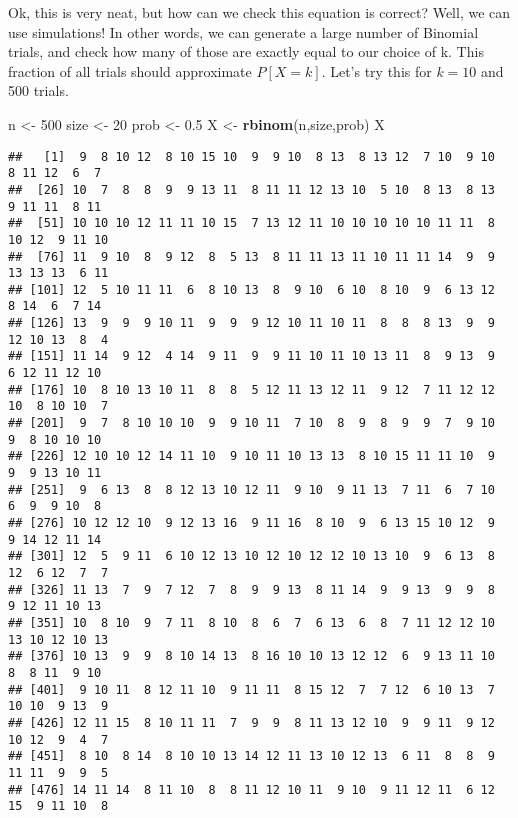 \documentclass[
]{book}
\newenvironment{Shaded}{\begin{snugshade}}{\end{snugshade}}
\newcommand{\DecValTok}[1]{\textcolor[rgb]{0.00,0.00,0.81}{#1}}
\newcommand{\FloatTok}[1]{\textcolor[rgb]{0.00,0.00,0.81}{#1}}
\newcommand{\KeywordTok}[1]{\textcolor[rgb]{0.13,0.29,0.53}{\textbf{#1}}}
\newcommand{\NormalTok}[1]{#1}
\newcommand{\StringTok}[1]{\textcolor[rgb]{0.31,0.60,0.02}{#1}}
\begin{document}
Ok, this is very neat, but how can we check this equation is correct? Well, we can use simulations! In other words, we can generate a large number of Binomial trials, and check how many of those are exactly equal to our choice of k. This fraction of all trials should approximate \(P[X=k]\). Let's try this for \(k=10\) and 500 trials.

\begin{Shaded}
\begin{Highlighting}[]
\NormalTok{n \textless{}{-}}\StringTok{ }\DecValTok{500}
\NormalTok{size \textless{}{-}}\StringTok{ }\DecValTok{20}
\NormalTok{prob \textless{}{-}}\StringTok{ }\FloatTok{0.5}
\NormalTok{X \textless{}{-}}\StringTok{ }\KeywordTok{rbinom}\NormalTok{(n,size,prob)}
\NormalTok{X}
\end{Highlighting}
\end{Shaded}

\begin{verbatim}
##   [1]  9  8 10 12  8 10 15 10  9  9 10  8 13  8 13 12  7 10  9 10  8 11 12  6  7
##  [26] 10  7  8  8  9  9 13 11  8 11 11 12 13 10  5 10  8 13  8 13  9 11 11  8 11
##  [51] 10 10 10 12 11 11 10 15  7 13 12 11 10 10 10 10 10 11 11  8 10 12  9 11 10
##  [76] 11  9 10  8  9 12  8  5 13  8 11 11 13 11 10 11 11 14  9  9 13 13 13  6 11
## [101] 12  5 10 11 11  6  8 10 13  8  9 10  6 10  8 10  9  6 13 12  8 14  6  7 14
## [126] 13  9  9  9 10 11  9  9  9 12 10 11 10 11  8  8  8 13  9  9 12 10 13  8  4
## [151] 11 14  9 12  4 14  9 11  9  9 11 10 11 10 13 11  8  9 13  9  6 12 11 12 10
## [176] 10  8 10 13 10 11  8  8  5 12 11 13 12 11  9 12  7 11 12 12 10  8 10 10  7
## [201]  9  7  8 10 10 10  9  9 10 11  7 10  8  9  8  9  9  7  9 10  9  8 10 10 10
## [226] 12 10 10 12 14 11 10  9 10 11 10 13 13  8 10 15 11 11 10  9  9  9 13 10 11
## [251]  9  6 13  8  8 12 13 10 12 11  9 10  9 11 13  7 11  6  7 10  6  9  9 10  8
## [276] 10 12 12 10  9 12 13 16  9 11 16  8 10  9  6 13 15 10 12  9  9 14 12 11 14
## [301] 12  5  9 11  6 10 12 13 10 12 10 12 12 10 13 10  9  6 13  8 12  6 12  7  7
## [326] 11 13  7  9  7 12  7  8  9  9 13  8 11 14  9  9 13  9  9  8  9 12 11 10 13
## [351] 10  8 10  9  7 11  8 10  8  6  7  6 13  6  8  7 11 12 12 10 13 10 12 10 13
## [376] 10 13  9  9  8 10 14 13  8 16 10 10 13 12 12  6  9 13 11 10  8  8 11  9 10
## [401]  9 10 11  8 12 11 10  9 11 11  8 15 12  7  7 12  6 10 13  7 10 10  9 13  9
## [426] 12 11 15  8 10 11 11  7  9  9  8 11 13 12 10  9  9 11  9 12 10 12  9  4  7
## [451]  8 10  8 14  8 10 10 13 14 12 11 13 10 12 13  6 11  8  8  9 11 11  9  9  5
## [476] 14 11 14  8 11 10  8  8 11 12 10 11  9 10  9 11 12 11  6 12 15  9 11 10  8
\end{verbatim}
\end{document}
